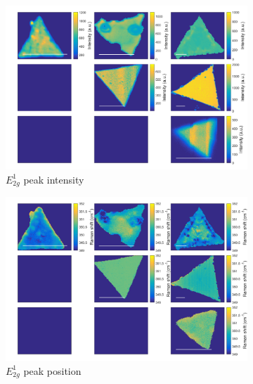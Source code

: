 \begin{figure}[H]
	\begin{center}
		\begin{subfigure}[b]{0.4\textwidth}
			\includegraphics[width=\textwidth]{PaperSIMapsIntensityE.png}
			\caption{$E^1_{2g}$ peak intensity}
			\label{fig:PaperSIMapsIntensityE}
		\end{subfigure}
		\quad
		\begin{subfigure}[b]{0.4\textwidth}
			\includegraphics[width=\textwidth]{PaperSIMapsPositionE.png}
			\caption{$E^1_{2g}$ peak position}
			\label{fig:PaperSIMapsPositionE}
		\end{subfigure}
		\hfill
		\begin{subfigure}[b]{0.4\textwidth}

\end{subfigure}
\end{center}
\end{figure}
